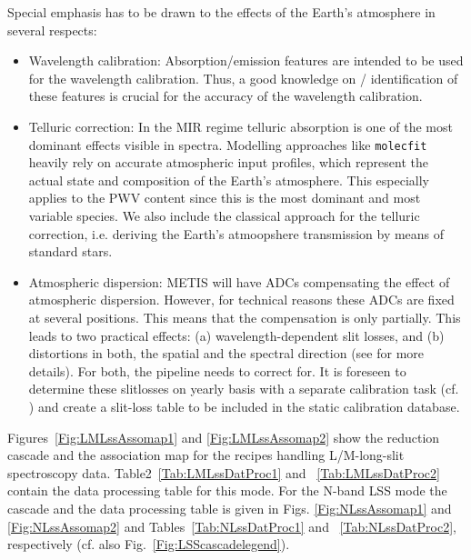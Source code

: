 Special emphasis has to be drawn to the effects of the Earth's
atmosphere in several respects:
\begin{itemize}
\item Wavelength calibration: Absorption/emission features are intended to be
  used for the wavelength calibration. Thus, a good knowledge on /
  identification of these features is crucial for the accuracy of the
  wavelength calibration.
\item Telluric correction: In the MIR regime telluric absorption is
  one of the most dominant effects visible in spectra. Modelling
  approaches like \texttt{molecfit} heavily rely on accurate
  atmospheric input profiles, which represent the actual state and
  composition of the Earth's atmosphere. This especially applies to
  the \ac{PWV} content since this is the most dominant and most variable species. We also include the classical approach for the telluric correction, i.e. deriving the Earth's atmoopshere transmission by means of standard stars.
\item Atmospheric dispersion: \ac{METIS} will have \ac{ADC}s compensating the
  effect of atmospheric dispersion. However, for technical reasons
  these ADCs are fixed at several positions. This means that the
  compensation is only partially. This leads to two practical effects:
  (a) wavelength-dependent slit losses, and (b) distortions in both,
  the spatial and the spectral direction (see \cite{METIS-ADC_study}
  for more details). For both, the pipeline needs to correct
  for. It is foreseen to determine these slitlosses on yearly basis with a separate calibration task (cf. \cite{METIS-calibration_plan}) and create a slit-loss table to be included in the static calibration database.
\end{itemize}


Figures~\ref{Fig:LMLssAssomap1} and \ref{Fig:LMLssAssomap2} show the reduction cascade and the association map for the recipes handling L/M-long-slit
spectroscopy data.  Table2~\ref{Tab:LMLssDatProc1} and ~\ref{Tab:LMLssDatProc2} contain the data processing table for this mode. For the N-band \ac{LSS} mode the cascade and the data processing table is given in Figs. \ref{Fig:NLssAssomap1} and \ref{Fig:NLssAssomap2} and Tables~\ref{Tab:NLssDatProc1} and ~\ref{Tab:NLssDatProc2}, respectively (cf. also Fig.~\ref{Fig:LSScascadelegend}).

